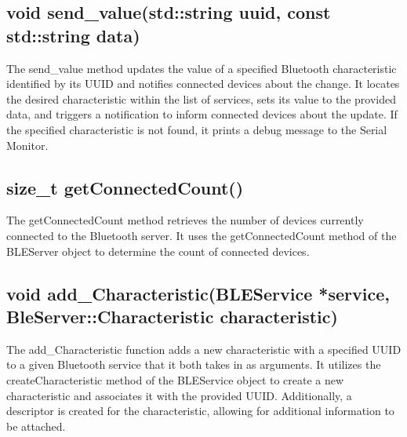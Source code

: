 \subsection{void send\_value(std::string uuid, const std::string data)}
\label{sub:send_value}
The send\_value method updates the value of a specified Bluetooth characteristic identified by its UUID and notifies connected devices about the change. 
It locates the desired characteristic within the list of services, sets its value to the provided data, and triggers a notification to inform connected devices about the update. 
If the specified characteristic is not found, it prints a debug message to the Serial Monitor. 

\subsection{size\_t getConnectedCount()}
\label{sub:getConnectedCount}
The getConnectedCount method retrieves the number of devices currently connected to the Bluetooth server. 
It uses the getConnectedCount method of the BLEServer object to determine the count of connected devices. 

\subsection{void add\_Characteristic(BLEService *service, BleServer::Characteristic characteristic)}
\label{sub:add_Characteristic}
The add\_Characteristic function adds a new characteristic with a specified UUID to a given Bluetooth service that it both takes in as arguments. 
It utilizes the createCharacteristic method of the BLEService object to create a new characteristic and associates it with the provided UUID. 
Additionally, a descriptor is created for the characteristic, allowing for additional information to be attached. 

